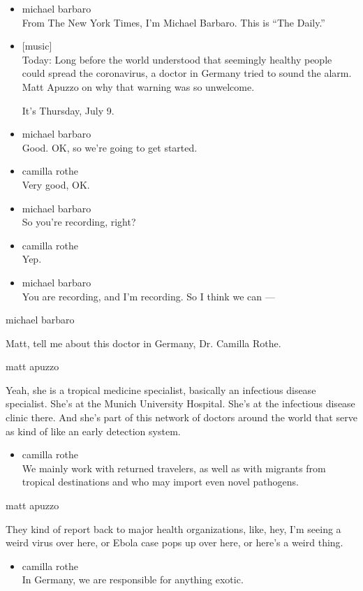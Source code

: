 \begin{itemize}
\item
  michael barbaro\\
  From The New York Times, I'm Michael Barbaro. This is ``The Daily.''
\item
  {[}music{]}\\
  Today: Long before the world understood that seemingly healthy people
  could spread the coronavirus, a doctor in Germany tried to sound the
  alarm. Matt Apuzzo on why that warning was so unwelcome.

  It's Thursday, July 9.
\item
  michael barbaro\\
  Good. OK, so we're going to get started.
\item
  camilla rothe\\
  Very good, OK.
\item
  michael barbaro\\
  So you're recording, right?
\item
  camilla rothe\\
  Yep.
\item
  michael barbaro\\
  You are recording, and I'm recording. So I think we can ---
\end{itemize}

michael barbaro

Matt, tell me about this doctor in Germany, Dr. Camilla Rothe.

matt apuzzo

Yeah, she is a tropical medicine specialist, basically an infectious
disease specialist. She's at the Munich University Hospital. She's at
the infectious disease clinic there. And she's part of this network of
doctors around the world that serve as kind of like an early detection
system.

\begin{itemize}
\tightlist
\item
  camilla rothe\\
  We mainly work with returned travelers, as well as with migrants from
  tropical destinations and who may import even novel pathogens.
\end{itemize}

matt apuzzo

They kind of report back to major health organizations, like, hey, I'm
seeing a weird virus over here, or Ebola case pops up over here, or
here's a weird thing.

\begin{itemize}
\tightlist
\item
  camilla rothe\\
  In Germany, we are responsible for anything exotic.
\end{itemize}

